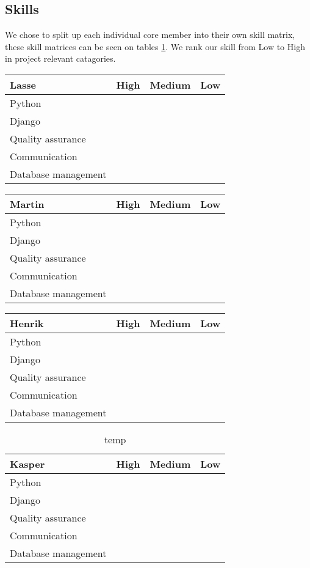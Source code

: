 \subsection{Skills}
We chose to split up each individual core member into their own skill matrix,
these skill matrices can be seen on tables \ref{tab:Skillz}.
We rank our skill from Low to High in project relevant catagories.
\begin{table}[!ht]
    \centering
    \begin{tabular}{l|l|l|l}
        \rowcolor{Gray}
        \textbf{Lasse} & \textbf{High} & \textbf{Medium} & \textbf{Low}\\\hline
         Python & & &\\
         Django & & &\\
         Quality assurance & & &\\
         Communication & & &\\
         Database management & & &
    \end{tabular}
\end{table}
\begin{table}[!ht]
    \centering
    \begin{tabular}{l|l|l|l}
        \rowcolor{Gray}
        \textbf{Martin} & \textbf{High} & \textbf{Medium} & \textbf{Low}\\\hline
         Python & & &\\
         Django & & &\\
         Quality assurance & & &\\
         Communication & & &\\
         Database management & & &
    \end{tabular}
\end{table}
\begin{table}[!ht]
    \centering
    \begin{tabular}{l|l|l|l}
        \rowcolor{Gray}
        \textbf{Henrik} & \textbf{High} & \textbf{Medium} & \textbf{Low}\\\hline
         Python & & &\\
         Django & & &\\
         Quality assurance & & &\\
         Communication & & &\\
         Database management & & &
    \end{tabular}
\end{table}
\begin{table}[!ht]
    \centering
    \begin{tabular}{l|l|l|l}
        \rowcolor{Gray}
        \textbf{Kasper} & \textbf{High} & \textbf{Medium} & \textbf{Low}\\\hline
         Python & & &\\
         Django & & &\\
         Quality assurance & & &\\
         Communication & & &\\
         Database management & & &
    \end{tabular}
    \caption{temp}
    \label{tab:Skillz}
\end{table}

